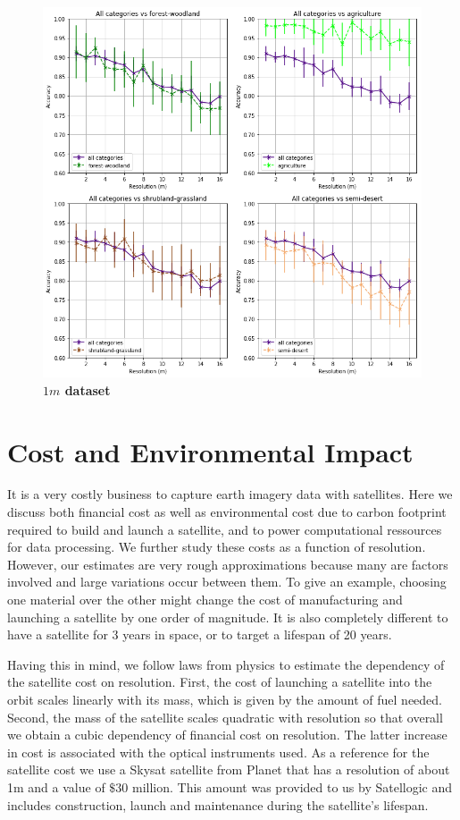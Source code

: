 \begin{figure}[h!]
	\centering
	\includegraphics[width=\textwidth]{Figures/results/acc_res_by_category_1m.png}
	\captionsetup{width=1\linewidth}
	\caption{\textbf{$1m$ dataset}}
	\label{fig:acc_by_cat_1m}
\end{figure}



\section{Cost and Environmental Impact}
It is a very costly business to capture earth imagery data with satellites. Here we discuss both financial cost as well as environmental cost due to carbon footprint required to build and launch a satellite, and to power computational ressources for data processing.
We further study these costs as a function of resolution. However, our estimates are very rough approximations because many are factors involved and large variations occur between them. To give an example, choosing one material over the other might change the cost of manufacturing and launching a satellite by one order of magnitude. It is also completely different to have a satellite for 3 years in space, or to target a lifespan of 20 years. 

Having this in mind, we follow laws from physics to estimate the dependency of the satellite cost on resolution. First, the cost of launching a satellite into the orbit scales linearly with its mass, which is given by the amount of fuel needed. Second, the mass of the satellite scales quadratic with resolution so that overall we obtain a cubic dependency of financial cost on resolution. The latter increase in cost is associated with the optical instruments used. As a reference for the satellite cost we use a Skysat satellite from Planet \parencite{skysat_planet} that has a resolution of about 1m and a value of $\$30$ million. This amount was provided to us by Satellogic and includes construction, launch and maintenance during the satellite's lifespan.

